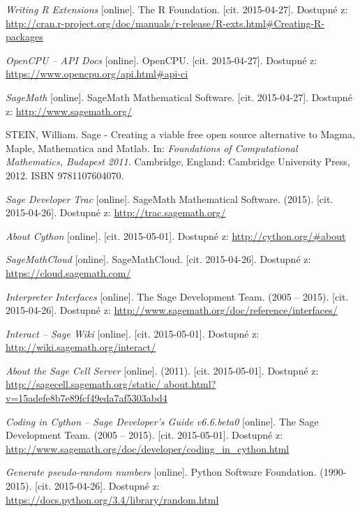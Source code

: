 \documentclass[thesis=B,czech]{FITthesis}[2012/06/26]
\begin{document}
\begin{thebibliography}{Per00}
\emph{Writing R Extensions} [online]. The R Foundation. [cit. 2015-04-27]. Dostupné z: \url{http://cran.r-project.org/doc/manuals/r-release/R-exts.html\#Creating-R-packages}

\emph{OpenCPU – API Docs} [online]. OpenCPU. [cit. 2015-04-27]. Dostupné z: \url{https://www.opencpu.org/api.html\#api-ci}

\emph{SageMath} [online]. SageMath Mathematical Software. [cit. 2015-04-27]. 
Dostupné z: \url{http://www.sagemath.org/}

STEIN, William. Sage - Creating a viable free open source alternative to Magma,
Maple, Mathematica and Matlab. In: \emph{Foundations of Computational Mathematics, 
Budapest 2011.}
Cambridge, England: Cambridge University Press, 2012. ISBN 9781107604070.

\emph{Sage Developer Trac} [online]. SageMath Mathematical Software. (2015). [cit. 2015-04-26]. Dostupné z: \url{http://trac.sagemath.org/}

\emph{About Cython} [online]. [cit. 2015-05-01]. Dostupné z: \url{http://cython.org/\#about}

\emph{SageMathCloud} [online]. SageMathCloud. [cit. 2015-04-26]. Dostupné z: \url{https://cloud.sagemath.com/}

\emph{Interpreter Interfaces} [online]. The Sage Development Team. (2005 – 2015). [cit. 2015-04-26]. Dostupné z: \url{http://www.sagemath.org/doc/reference/interfaces/}

\emph{Interact – Sage Wiki} [online]. [cit. 2015-05-01]. Dostupné z: \url{http://wiki.sagemath.org/interact/}

\emph{About the Sage Cell Server} [online]. (2011). [cit. 2015-05-01]. Dostupné z: \url{http://sagecell.sagemath.org/static/
about.html?v=15adefe8b7e89fcf49eda7af5303abd4}

\emph{Coding in Cython – Sage Developer’s Guide v6.6.beta0} [online]. The Sage Development Team. (2005 – 2015). [cit. 2015-05-01]. Dostupné z: \url{http://www.sagemath.org/doc/developer/coding\_in\_cython.html}

\emph{Generate pseudo-random numbers} [online]. Python Software Foundation. (1990-2015). [cit. 2015-04-26]. Dostupné z: \url{https://docs.python.org/3.4/library/random.html}


\end{thebibliography}
\end{document}
